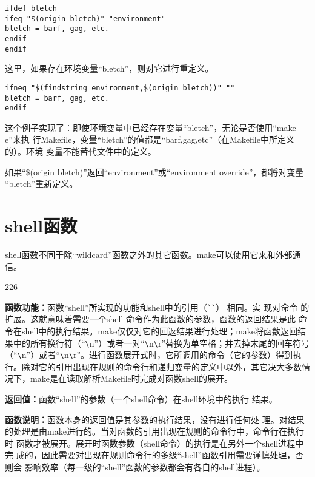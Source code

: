 \begin{Verbatim}[]
ifdef bletch
ifeq "$(origin bletch)" "environment"
bletch = barf, gag, etc.
endif
endif
\end{Verbatim}

这里，如果存在环境变量“bletch”，则对它进行重定义。
\begin{Verbatim}[]
ifneq "$(findstring environment,$(origin bletch))" ""
bletch = barf, gag, etc.
endif
\end{Verbatim}

这个例子实现了：即使环境变量中已经存在变量“bletch”，无论是否使用“make -e”来执
行Makefile，变量“bletch”的值都是“barf,gag,etc”（在Makefile中所定义的）。环境
变量不能替代文件中的定义。

如果“\$(origin bletch)”返回“environment”或“environment override”，都将对变量
“bletch”重新定义。


\section{shell函数}
shell函数不同于除“wildcard”函数之外的其它函数。make可以使用它来和外部通信。

\begin{dinglist}{226}
\itemsep=4pt \parskip=0pt
\item \textbf{函数功能：}函数“shell”所实现的功能和shell中的引用（\verb"``"）
    相同。实
    现对命令
    的扩展。这就意味着需要一个shell 命令作为此函数的参数，函数的返回结果是此
    命令在shell中的执行结果。make仅仅对它的回返结果进行处理；make将函数返回结
    果中的所有换行符（“\verb"\"n”）或者一对“\verb"\"n\verb"\"r”替换为单空格；并去掉末尾的回车符号
    （“\verb"\"n”）或者“\verb"\"n\verb"\"r”。进行函数展开式时，它所调用的命令（它的参数）得到执
    行。除对它的引用出现在规则的命令行和递归变量的定义中以外，其它决大多数情
    况下，make是在读取解析Makefile时完成对函数shell的展开。

\item \textbf{返回值：}函数“shell”的参数（一个shell命令）在shell环境中的执行
    结果。

\item \textbf{函数说明：}函数本身的返回值是其参数的执行结果，没有进行任何处
    理。对结果
    的处理是由make进行的。当对函数的引用出现在规则的命令行中，命令行在执行时
    函数才被展开。展开时函数参数（shell命令）的执行是在另外一个shell进程中完
    成的，因此需要对出现在规则命令行的多级“shell”函数引用需要谨慎处理，否则会
    影响效率（每一级的“shell”函数的参数都会有各自的shell进程）。
\end{dinglist}


